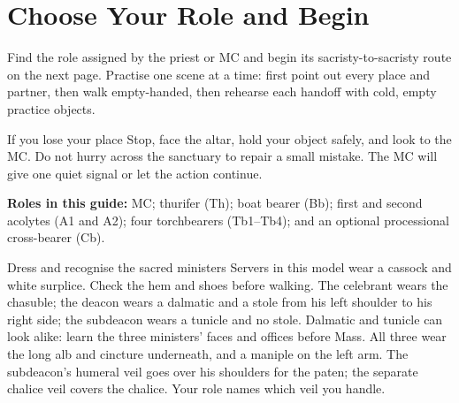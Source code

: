 \section{Choose Your Role and Begin}

Find the role assigned by the priest or MC and begin its sacristy-to-sacristy
route on the next page. Practise one scene at a time: first point out every
place and partner, then walk empty-handed, then rehearse each handoff with
cold, empty practice objects.

\Needspace{0.14\textheight}
\begin{learnerbox}{If you lose your place}
Stop, face the altar, hold your object safely, and look to the MC. Do not hurry
across the sanctuary to repair a small mistake. The MC will give one quiet
signal or let the action continue.
\end{learnerbox}

\noindent\textbf{Roles in this guide:} MC; thurifer (Th); boat bearer (Bb);
first and second acolytes (A1 and A2); four torchbearers (Tb1--Tb4); and an
optional processional cross-bearer (Cb).

\begin{learnerbox}{Dress and recognise the sacred ministers}
Servers in this model wear a cassock and white surplice. Check the hem and
shoes before walking. The celebrant wears the chasuble; the deacon wears a
dalmatic and a stole from his left shoulder to his right side; the subdeacon
wears a tunicle and no stole. Dalmatic and tunicle can look alike: learn the
three ministers' faces and offices before Mass. All three wear the long alb
and cincture underneath, and a maniple on the left arm. The subdeacon's
humeral veil goes over his shoulders for the paten; the separate chalice
veil covers the chalice. Your role names which veil you handle.
\end{learnerbox}

